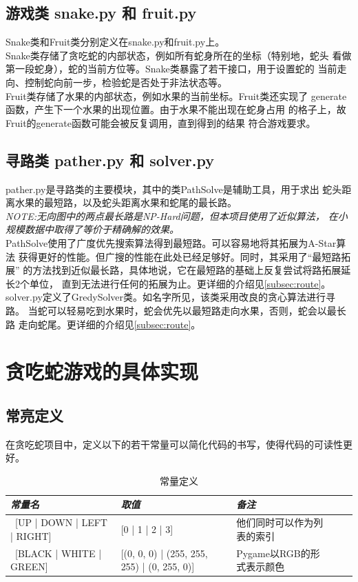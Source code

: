 \documentclass[a4paper]{article}
\begin{document}
\subsection{游戏类 snake.py 和 fruit.py}
Snake类和Fruit类分别定义在snake.py和fruit.py上。\\

Snake类存储了贪吃蛇的内部状态，例如所有蛇身所在的坐标（特别地，蛇头
看做第一段蛇身），蛇的当前方位等。Snake类暴露了若干接口，用于设置蛇的
当前走向、控制蛇向前一步，检验蛇是否处于非法状态等。\\

Fruit类存储了水果的内部状态，例如水果的当前坐标。Fruit类还实现了
generate函数，产生下一个水果的出现位置。由于水果不能出现在蛇身占用
的格子上，故Fruit的generate函数可能会被反复调用，直到得到的结果
符合游戏要求。

\subsection{寻路类 pather.py 和 solver.py}
pather.py是寻路类的主要模块，其中的类PathSolve是辅助工具，用于求出
蛇头距离水果的最短路，以及蛇头距离水果和蛇尾的最长路。\\

\emph{NOTE:无向图中的两点最长路是NP-Hard问题，但本项目使用了近似算法，
在小规模数据中取得了等价于精确解的效果。} \\

PathSolve使用了广度优先搜索算法得到最短路。可以容易地将其拓展为A-Star算法
获得更好的性能。但广搜的性能在此处已经足够好。同时，其采用了``最短路拓展''
的方法找到近似最长路，具体地说，它在最短路的基础上反复尝试将路拓展延长2个单位，
直到无法进行任何的拓展为止。更详细的介绍见\autoref{subsec:route}。\\

solver.py定义了GredySolver类。如名字所见，该类采用改良的贪心算法进行寻路。
当蛇可以轻易吃到水果时，蛇会优先以最短路走向水果，否则，蛇会以最长路
走向蛇尾。更详细的介绍见\autoref{subsec:route}。

\section{贪吃蛇游戏的具体实现}
\subsection{常亮定义}
在贪吃蛇项目中，定义以下的若干常量可以简化代码的书写，使得代码的可读性更好。
\begin{table}[!htb]
\caption{常量定义}\label{tab:const}
\begin{tabular}{@{} *5l @{}}
    \toprule
    \emph{常量名} & \emph{取值} &\emph{备注}&& \\
    \midrule
    \ [UP | DOWN | LEFT | RIGHT]  & [0 | 1 | 2 | 3] & 他们同时可以作为列表的索引 \\
    \ [BLACK | WHITE | GREEN] & [(0, 0, 0) | (255, 255, 255) | (0, 255, 0)] & Pygame以RGB的形式表示颜色 \\
    \bottomrule
\hline
\end{tabular}
\end{table}
\end{document}
